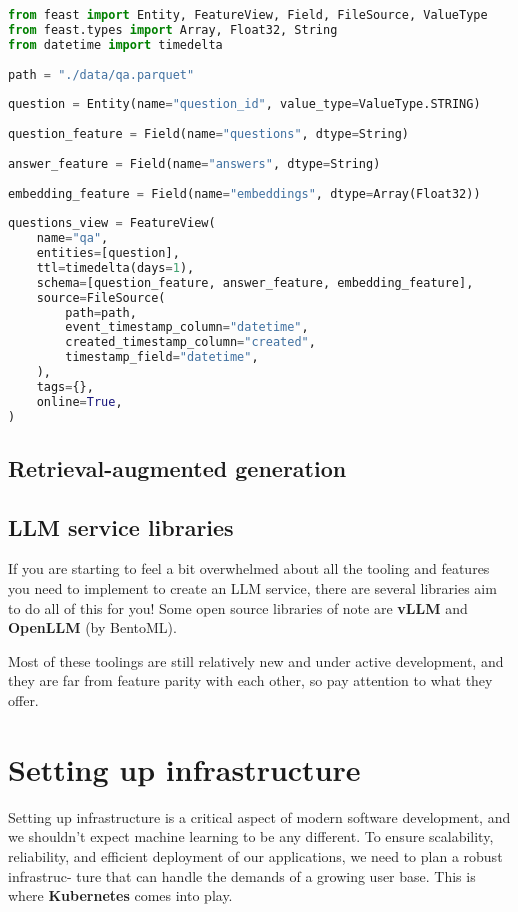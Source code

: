 \begin{lstlisting}[language=Python]
from feast import Entity, FeatureView, Field, FileSource, ValueType
from feast.types import Array, Float32, String
from datetime import timedelta
 
path = "./data/qa.parquet"
 
question = Entity(name="question_id", value_type=ValueType.STRING)
 
question_feature = Field(name="questions", dtype=String)
 
answer_feature = Field(name="answers", dtype=String)
 
embedding_feature = Field(name="embeddings", dtype=Array(Float32))
 
questions_view = FeatureView(
    name="qa",
    entities=[question],
    ttl=timedelta(days=1),
    schema=[question_feature, answer_feature, embedding_feature],
    source=FileSource(
        path=path,
        event_timestamp_column="datetime",
        created_timestamp_column="created",
        timestamp_field="datetime",
    ),
    tags={},
    online=True,
)
\end{lstlisting}

\subsection{Retrieval-augmented generation}

\subsection{LLM service libraries}
If you are starting to feel a bit overwhelmed about all the tooling and features you need to implement to create an LLM service, there are several libraries aim to do all of this for you! Some open source libraries of note are \textbf{vLLM} and \textbf{OpenLLM} (by BentoML).

Most of these toolings are still relatively new and under active development, and they are far from feature parity with each other, so pay attention to what they offer.

\section{Setting up infrastructure}

Setting up infrastructure is a critical aspect of modern software development, and we shouldn't expect machine learning to be any different. To ensure scalability, reliability, and efficient deployment of our applications, we need to plan a robust infrastruc- ture that can handle the demands of a growing user base. This is where \textbf{Kubernetes} comes into play.

